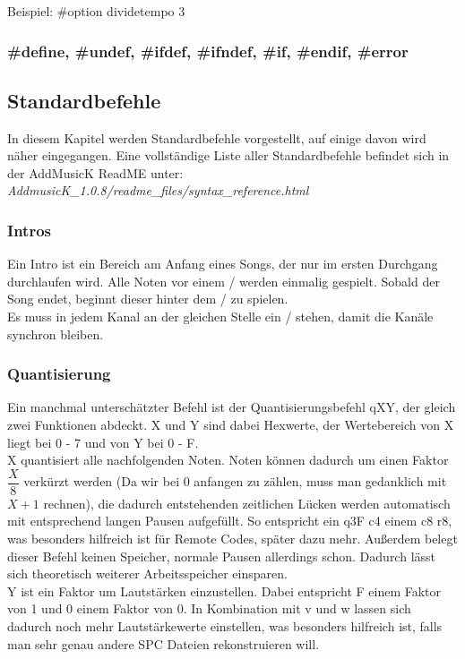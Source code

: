 Beispiel: \#option dividetempo 3


\subsubsection*{\#define, \#undef, \#ifdef, \#ifndef, \#if, \#endif, \#error}

\subsection{Standardbefehle}

In diesem Kapitel werden Standardbefehle vorgestellt, auf einige davon wird näher eingegangen.
Eine vollständige Liste aller Standardbefehle befindet sich in der AddMusicK ReadME unter:
 \textit{AddmusicK\_1.0.8/readme\_files/syntax\_reference.html}
\bigskip


\subsubsection{Intros}

Ein Intro ist ein Bereich am Anfang eines Songs, der nur im ersten Durchgang durchlaufen wird. Alle Noten vor einem / werden einmalig gespielt. Sobald der Song endet, beginnt dieser hinter dem / zu spielen. \\
Es muss in jedem Kanal an der gleichen Stelle ein / stehen, damit die Kanäle synchron bleiben.

\subsubsection{Quantisierung}

Ein manchmal unterschätzter Befehl ist der Quantisierungsbefehl qXY, der gleich zwei Funktionen abdeckt. X und Y sind dabei Hexwerte, der Wertebereich von X liegt bei 0 - 7 und von Y bei 0 - F. \\
X \dq quantisiert\dq{} alle nachfolgenden Noten. Noten können dadurch um einen Faktor $ \dfrac{X}{8} $ verkürzt werden (Da wir bei 0 anfangen zu zählen, muss man gedanklich mit $X+1$ rechnen), die dadurch entstehenden zeitlichen Lücken werden automatisch mit entsprechend langen Pausen aufgefüllt. So entspricht ein q3F c4 einem c8 r8, was besonders hilfreich ist für Remote Codes, später dazu mehr. Außerdem belegt dieser Befehl keinen Speicher, normale Pausen allerdings schon. Dadurch lässt sich theoretisch weiterer Arbeitsspeicher einsparen.\\
Y ist ein Faktor um Lautstärken einzustellen. Dabei entspricht F einem Faktor von 1 und 0 einem Faktor von 0. In Kombination mit v und w lassen sich dadurch noch mehr Lautstärkewerte einstellen, was besonders hilfreich ist, falls man sehr genau andere SPC Dateien rekonstruieren will.

